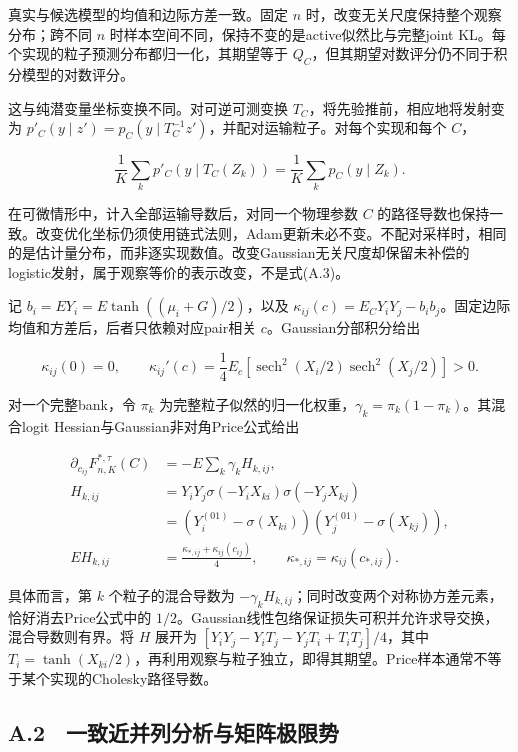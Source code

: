 \documentclass[11pt,a4paper]{article}
\begin{document}
真实与候选模型的均值和边际方差一致。固定 \(n\)
时，改变无关尺度保持整个观察分布；跨不同 \(n\)
时样本空间不同，保持不变的是active似然比与完整joint
KL。每个实现的粒子预测分布都归一化，其期望等于
\(Q_C\)，但其期望对数评分仍不同于积分模型的对数评分。

这与纯潜变量坐标变换不同。对可逆可测变换
\(T_C\)，将先验推前，相应地将发射变为
\(p'_C(y\mid z')=p_C(y\mid T_C^{-1}z')\)，并配对运输粒子。对每个实现和每个
\(C\)，

\[
\frac1K\sum_kp'_C(y\mid T_C(Z_k))
=\frac1K\sum_kp_C(y\mid Z_k).
\tag{A.3}
\]

在可微情形中，计入全部运输导数后，对同一个物理参数 \(C\)
的路径导数也保持一致。改变优化坐标仍须使用链式法则，Adam更新未必不变。不配对采样时，相同的是估计量分布，而非逐实现数值。改变Gaussian无关尺度却保留未补偿的logistic发射，属于观察等价的表示改变，不是式(A.3)。

记 \(b_i=E Y_i=E\tanh((\mu_i+G)/2)\)，以及
\(\kappa_{ij}(c)=E_CY_iY_j-b_ib_j\)。固定边际均值和方差后，后者只依赖对应pair相关
\(c\)。Gaussian分部积分给出

\[
\kappa_{ij}(0)=0,\qquad
\kappa_{ij}'(c)=\frac14E_c[
\operatorname{sech}^2(X_i/2)\operatorname{sech}^2(X_j/2)]>0 .
\tag{A.4}
\]

对一个完整bank，令 \(\pi_k\)
为完整粒子似然的归一化权重，\(\gamma_k=\pi_k(1-\pi_k)\)。其混合logit
Hessian与Gaussian非对角Price公式给出

\[
\begin{aligned}
\partial_{c_{ij}}F_{n,K}^{*,\tau}(C)
&=-E\sum_k\gamma_kH_{k,ij},\\
H_{k,ij}
&=Y_iY_j\sigma(-Y_iX_{ki})\sigma(-Y_jX_{kj})\\
&=(Y_i^{(01)}-\sigma(X_{ki}))(Y_j^{(01)}-\sigma(X_{kj})),\\
EH_{k,ij}&=\frac{\kappa_{*,ij}+\kappa_{ij}(c_{ij})}{4},
\qquad \kappa_{*,ij}=\kappa_{ij}(c_{*,ij}).
\end{aligned}
\tag{A.5}
\]

具体而言，第 \(k\) 个粒子的混合导数为
\(-\gamma_kH_{k,ij}\)；同时改变两个对称协方差元素，恰好消去Price公式中的
\(1/2\)。Gaussian线性包络保证损失可积并允许求导交换，混合导数则有界。将
\(H\) 展开为 \([Y_iY_j-Y_iT_j-Y_jT_i+T_iT_j]/4\)，其中
\(T_i=\tanh(X_{ki}/2)\)，再利用观察与粒子独立，即得其期望。Price样本通常不等于某个实现的Cholesky路径导数。

\subsection*{A.2　一致近并列分析与矩阵极限势}\label{a.2-ux4e00ux81f4ux8fd1ux5e76ux5217ux5206ux6790ux4e0eux77e9ux9635ux6781ux9650ux52bf}
\end{document}
